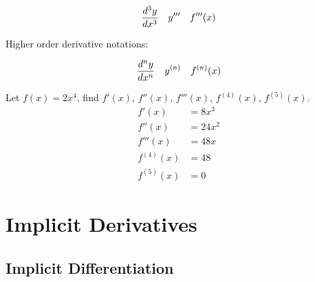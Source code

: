 \begin{align}\nonumber
    {d^3y \over dx^3} &  & y''' &  & f'''(x)
\end{align}

Higher order derivative notations:

\begin{align}\nonumber
    {d^ny \over dx^n} &  & y^{(n)} &  & f^{(n)}(x)
\end{align}

\begin{exercise}\nonumber
    Let $ f(x) = 2x^4 $, find $ f'(x) $, $ f''(x) $, $ f'''(x) $, $ f^{(4)}(x) $, $ f^{(5)}(x) $. \\

    \begin{align}
        f'(x)      & = 8x^3  \\
        f''(x)     & = 24x^2 \\
        f'''(x)    & = 48x   \\
        f^{(4)}(x) & = 48    \\
        f^{(5)}(x) & = 0
    \end{align}
\end{exercise}

\chapter{Implicit Derivatives}

\section{Implicit Differentiation}

